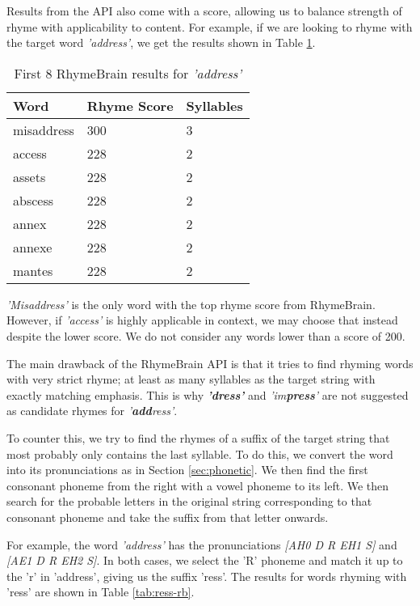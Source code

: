 Results from the API also come with a score, allowing us to balance strength of rhyme with applicability to content. For example, if we are looking to rhyme with the target word \textit{'address'}, we get the results shown in Table \ref{tab:address-rb}.

\begin{table}
    \begin{tabular}{|l|l|l|}
    \hline
    Word       & Rhyme Score & Syllables \\ \hline
    misaddress & 300         & 3         \\ \hline
    access     & 228         & 2         \\ \hline
    assets     & 228         & 2         \\ \hline
    abscess    & 228         & 2         \\ \hline
    annex      & 228         & 2         \\ \hline
    annexe     & 228         & 2         \\ \hline
    mantes     & 228         & 2         \\ \hline
    \end{tabular}
\caption{First 8 RhymeBrain results for \textit{'address'}}
\label{tab:address-rb}
\end{table}

\textit{'Misaddress'} is the only word with the top rhyme score from RhymeBrain. However, if \textit{'access'} is highly applicable in context, we may choose that instead despite the lower score. We do not consider any words lower than a score of 200.

The main drawback of the RhymeBrain API is that it tries to find rhyming words with very strict rhyme; at least as many syllables as the target string with exactly matching emphasis. This is why \textbf{\textit{'dress'}} and \textit{'im\textbf{press}'} are not suggested as candidate rhymes for \textit{'\textbf{add}ress'}.

To counter this, we try to find the rhymes of a suffix of the target string that most probably only contains the last syllable. To do this, we convert the word into its pronunciations as in Section \ref{sec:phonetic}. We then find the first consonant phoneme from the right with a vowel phoneme to its left. We then search for the probable letters in the original string corresponding to that consonant phoneme and take the suffix from that letter onwards.

For example, the word \textit{'address'} has the pronunciations \textit{[AH0 D R EH1 S]} and \textit{[AE1 D R EH2 S]}. In both cases, we select the 'R' phoneme and match it up to the 'r' in 'address', giving us the suffix 'ress'. The results for words rhyming with 'ress' are shown in Table \ref{tab:ress-rb}.

